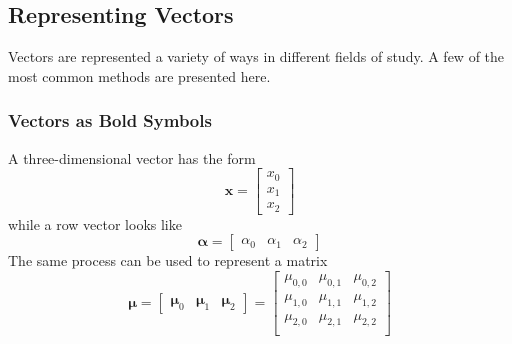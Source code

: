 \subsection{Representing Vectors}
    Vectors are represented a variety of ways in different fields of study.
    A few of the most common methods are presented here.

\subsubsection{Vectors as Bold Symbols}
    A three-dimensional vector has the form
    \begin{equation}
        \bm{x}
            =\begin{bmatrix}
                x_0 \\ x_1 \\ x_2
             \end{bmatrix}
    \end{equation}
    while a row vector looks like
    \begin{equation}
        \bm{\alpha}
            =\begin{bmatrix}
                \alpha_0 & \alpha_1 & \alpha_2
             \end{bmatrix}
    \end{equation}
    The same process can be used to represent a matrix
    \begin{equation}
        \bm{\mu}
            =\begin{bmatrix}
                \bm{\mu}_0 & \bm{\mu}_1 & \bm{\mu}_{2}
             \end{bmatrix}
            =\begin{bmatrix}
                \mu_{0,0} & \mu_{0,1} & \mu_{0,2} \\
                \mu_{1,0} & \mu_{1,1} & \mu_{1,2} \\
                \mu_{2,0} & \mu_{2,1} & \mu_{2,2} \\
             \end{bmatrix}
    \end{equation}

